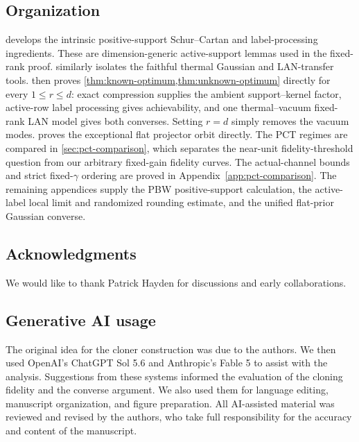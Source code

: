 \documentclass[11pt]{article}
\theoremstyle{remark}
\theoremstyle{plain}
\begin{document}
\subsection{Organization}

 develops the intrinsic positive-support
Schur--Cartan and label-processing ingredients.  These are
dimension-generic active-support lemmas used in the fixed-rank proof.
 similarly isolates the faithful thermal Gaussian and
LAN-transfer tools.   then proves
\cref{thm:known-optimum,thm:unknown-optimum} directly for every
\(1\le r\le d\): exact compression supplies the ambient
support--kernel factor, active-row label processing gives achievability, and
one thermal--vacuum fixed-rank LAN model gives both converses.  Setting
\(r=d\) simply removes the vacuum modes.   proves the
exceptional flat projector orbit directly.  The PCT regimes are compared in
\cref{sec:pct-comparison}, which separates the near-unit fidelity-threshold
question from our arbitrary fixed-gain fidelity curves.  The actual-channel
bounds and strict fixed-\(\gamma\) ordering are proved in
Appendix~\ref{app:pct-comparison}.  The remaining appendices supply the PBW
positive-support calculation, the active-label local limit and randomized
rounding estimate, and the unified flat-prior Gaussian converse.

\subsection*{Acknowledgments}

We would like to thank Patrick Hayden for discussions and early collaborations.

\subsection*{Generative AI usage}

The original idea for the cloner construction was due to the authors.  We
then used OpenAI's ChatGPT Sol 5.6 and Anthropic's Fable 5 to assist with the
analysis.  Suggestions from these systems informed the evaluation of the
cloning fidelity and the converse argument.  We also used them for language
editing, manuscript organization, and figure preparation.  All AI-assisted
material was reviewed
and revised by the authors, who take full responsibility for the accuracy and
content of the manuscript.
\end{document}
